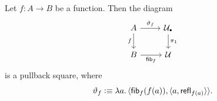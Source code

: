 \begin{thm}\fe
    Let\/ $f\colon A\to B$ be a function. Then the diagram
    \[
        \begin{tikzcd}
            A
                    \arrow[r,"\vartheta_f"]
                    \arrow[d,"f"']
                &\puniv
                    \arrow[d,"\pi_1"]\\
            B
                    \arrow[r,"\fun{fib}_f"']
                &\univ
        \end{tikzcd}
    \]
    is a pullback square, where
    \[
        \vartheta_f\mathrel{\vcentcolon}\equiv\lambda a.\,
            \langle
                \mathsf{fib}_f(f(a)),
                \langle
                    a,
                    \mathsf{refl}_{f(a)}
                \rangle
            \rangle.
    \]
\end{thm}

